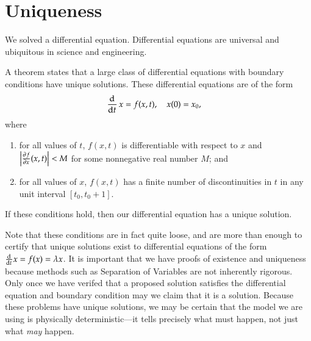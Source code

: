 \section{Uniqueness}
We solved a differential equation. Differential equations are universal and ubiquitous in science and engineering.

A theorem states that a large class of differential equations with boundary conditions have unique solutions. These differential equations are of the form
\begin{align}
  \dod{}{t} x
  &= f(x, t), \quad x(0) = x_0,
\end{align}
where
\begin{enumerate}
  \item
  for all values of \(t\), \(f(x, t)\) is differentiable with respect to \(x\) and
  \(\abs{ \pd{f}{x} (x,t) } < M\) for some nonnegative real number \(M\); and
  \item for all values of \(x\), \(f(x,t)\) has a finite number of discontinuities in \(t\) in any unit interval \([t_0, t_0 + 1]\).
\end{enumerate}
If these conditions hold, then our differential equation has a unique solution.

Note that these conditions are in fact quite loose, and are more than enough to certify that unique solutions exist to differential equations of the form \(\od{}{t} x = f(x) = \lambda x\).
It is important that we have proofs of existence and uniqueness because methods such as Separation of Variables are not inherently rigorous.
Only once we have verifed that a proposed solution satisfies the differential equation and boundary condition may we claim that it is a solution.
Because these problems have unique solutions, we may be certain that the model we are using is physically deterministic---it tells precisely what must happen, not just what \emph{may} happen.
